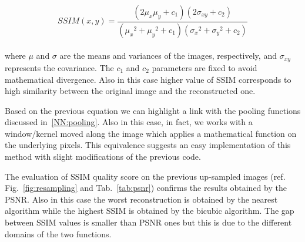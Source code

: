 \documentclass{standalone}
\begin{document}
$$
SSIM(x, y) = \frac{(2\mu_x\mu_y + c_1)(2\sigma_{xy} + c_2)}{ ({\mu_x}^2 + {\mu_y}^2 + c_1)({\sigma_x}^2 + {\sigma_y}^2 + c_2) }
$$
\\
where $\mu$ and $\sigma$ are the means and variances of the images, respectively, and $\sigma_{xy}$ represents the covariance.
The $c_1$ and $c_2$ parameters are fixed to avoid mathematical divergence.
Also in this case higher value of SSIM corresponds to high similarity between the original image and the reconstructed one.

Based on the previous equation we can highlight a link with the pooling functions discussed in~\ref{NN:pooling}.
Also in this case, in fact, we works with a window/kernel moved along the image which applies a mathematical function on the underlying pixels.
This equivalence suggests an easy implementation of this method with slight modifications of the previous code.

The evaluation of SSIM quality score on the previous up-sampled images (ref. Fig.~\ref{fig:resampling} and Tab.~\ref{tab:psnr}) confirms the results obtained by the PSNR.
Also in this case the worst reconstruction is obtained by the nearest algorithm while the highest SSIM is obtained by the bicubic algorithm.
The gap between SSIM values is smaller than PSNR ones but this is due to the different domains of the two functions.
\end{document}
